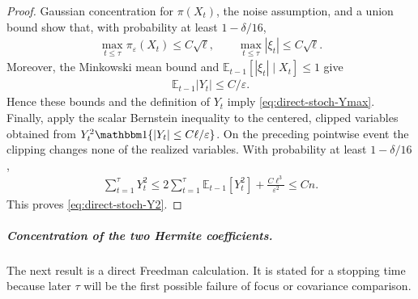 \documentclass{article}
\theoremstyle{plain}
\theoremstyle{definition}
\theoremstyle{plain}
\newcommand{\E}{\mathbb E}
\begin{document}
\begin{proof}
    Gaussian concentration for $\pi(X_t)$, the noise assumption, and
    a union bound show that, with probability at least $1-\delta/16$,
    \begin{align}
        \max_{t\leq\tau}\pi_\varepsilon(X_t)\leq C\sqrt\ell,
        \qquad
        \max_{t\leq\tau}|\xi_t|\leq C\sqrt\ell.
    \end{align}
    Moreover, the Minkowski mean bound and
    $\E_{t-1}[|\xi_t|\mid X_t]\leq1$ give
    \begin{align}
        \E_{t-1}|Y_t|\leq C/\varepsilon.
    \end{align}
    Hence these bounds and the definition of $Y_t$ imply
    \eqref{eq:direct-stoch-Ymax}.  Finally, apply the scalar Bernstein
    inequality to the centered, clipped variables obtained from
    $Y_t^2\mathbbm 1\{|Y_t|\leq C\ell/\varepsilon\}$.  On the preceding
    pointwise event the clipping changes none of the realized
    variables.  With probability
    at least $1-\delta/16$,
    \begin{align}
        \sum_{t=1}^{\tau}Y_t^2
        \leq
        2\sum_{t=1}^{\tau}\E_{t-1}[Y_t^2]
        +\frac{C\ell^3}{\varepsilon^2}
        \leq Cn.
    \end{align}
    This proves \eqref{eq:direct-stoch-Y2}.
\end{proof}

\subparagraph{Concentration of the two Hermite coefficients.}
The next result is a direct Freedman calculation.  It is stated for a
stopping time because later $\tau$ will be the first possible failure
of focus or covariance comparison.
\end{document}
